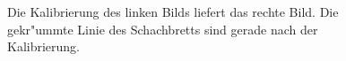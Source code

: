 \documentclass[arbeit=studie,oneside,BCOR=12mm]{ArbeitRST}
\begin{document}
\begin{figure}[h]
    \centering
    \caption{Die Kalibrierung des linken Bilds liefert das rechte Bild. Die gekr"ummte Linie 
    des Schachbretts sind gerade nach der Kalibrierung.} 
    \label{checkerboards}
\end{figure}
\end{document}

